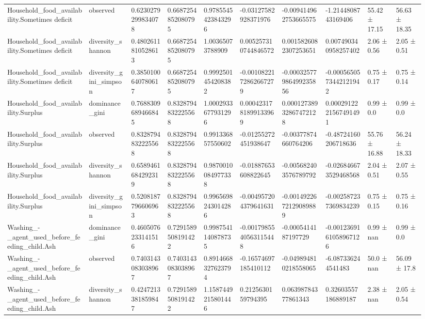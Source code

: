\begin{longtable}{llllllllll}
Household\_food\_availability.Sometimes deficit & observed & 0.6230279299834078 & 0.6687254852080795 & 0.9785545423843296 & -0.03127582928371976 & -0.009414962753665575 & -1.2144808743169406 & 55.42 ± 17.15 & 56.63 ± 18.35 \\
Household\_food\_availability.Sometimes deficit & diversity\_shannon & 0.4802611810528613 & 0.6687254852080795 & 1.00365073788909 & 0.005257310744846572 & 0.0015826082307253651 & 0.007490340958257402 & 2.06 ± 0.56 & 2.05 ± 0.51 \\
Household\_food\_availability.Sometimes deficit & diversity\_gini\_simpson & 0.3850100640780617 & 0.6687254852080795 & 0.9992501454208382 & -0.0010822172862667279 & -0.00032577986499235856 & -0.0005650573442121942 & 0.75 ± 0.17 & 0.75 ± 0.14 \\
Household\_food\_availability.Surplus & dominance\_gini & 0.7688309689466845 & 0.8328794832225568 & 1.0002933677931296 & 0.0004231781899133969 & 0.00012738932867472128 & 0.0002912221567491491 & 0.99 ± 0.0 & 0.99 ± 0.0 \\
Household\_food\_availability.Surplus & observed & 0.8328794832225568 & 0.8328794832225568 & 0.991336857550602 & -0.01255272451938647 & -0.00377874660764206 & -0.48724160206718636 & 55.76 ± 16.88 & 56.24 ± 18.33 \\
Household\_food\_availability.Surplus & diversity\_shannon & 0.6589461684292319 & 0.8328794832225568 & 0.9870010084977338 & -0.01887653608822645 & -0.005682403576789792 & -0.026846673529468568 & 2.04 ± 0.51 & 2.07 ± 0.55 \\
Household\_food\_availability.Surplus & diversity\_gini\_simpson & 0.5208187796606963 & 0.8328794832225568 & 0.9965698243014286 & -0.004957204379641631 & -0.0014922672129089889 & -0.002587237369834239 & 0.75 ± 0.15 & 0.75 ± 0.16 \\
Washing\_-\_agent\_used\_before\_feeding\_child.Ash & dominance\_gini & 0.4605076233141516 & 0.7291589508191422 & 0.9987541140878735 & -0.0017985540563115448 & -0.0005414187197729 & -0.0012369161058967126 & 0.99 ± nan & 0.99 ± 0.0 \\
Washing\_-\_agent\_used\_before\_feeding\_child.Ash & observed & 0.7403143083038967 & 0.7403143083038967 & 0.8914668327623794 & -0.16574697185410112 & -0.049894810218558065 & -6.087336244541483 & 50.0 ± nan & 56.09 ± 17.8 \\
Washing\_-\_agent\_used\_before\_feeding\_child.Ash & diversity\_shannon & 0.4247213381859847 & 0.7291589508191422 & 1.1587449215801446 & 0.2125630159794395 & 0.06398784377861343 & 0.32603557186889187 & 2.38 ± nan & 2.05 ± 0.54 \\

\end{longtable}

